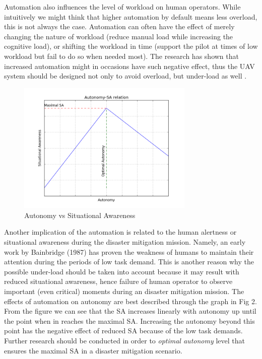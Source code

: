 \documentclass[12pt, letterpaper, oneside]{article}
\begin{document}
Automation also influences the level of workload on human operators. While intuitively we might think that higher automation by default means less overload, this is not always the case. Automation can often have the effect of merely changing the nature of workload (reduce manual load while increasing the cognitive load), or shifting the workload in time (support the pilot at times of low workload but fail to do so when needed most). The research has shown that increased automation might in occasions have such negative effect, thus the UAV system should be designed not only to avoid overload, but under-load as well \cite{9}. 

\begin{figure}[h!]
  \caption{Autonomy vs Situational Awareness}
  \centering
    \includegraphics[width=0.75\textwidth]{autonomy}
\end{figure}

Another implication of the automation is related to the human alertness or situational awareness during the disaster mitigation mission. Namely, an early work by Bainbridge (1987) \cite{20} has proven the weakness of humans to maintain their attention during the periods of low task demand. This is another reason why the possible under-load should be taken into account because it may result with reduced situational awareness, hence failure of human operator to observe important (even critical) moments during an disaster mitigation mission. The effects of automation on autonomy are best described through the graph in Fig 2. From the figure we can see that the SA increases linearly with autonomy up until the point when in reaches the maximal SA. Increasing the autonomy beyond this point has the negative effect of reduced SA because of the low task demands. Further research should be conducted in order to \emph{optimal autonomy} level that ensures the maximal SA in a disaster mitigation scenario. 
\end{document}
